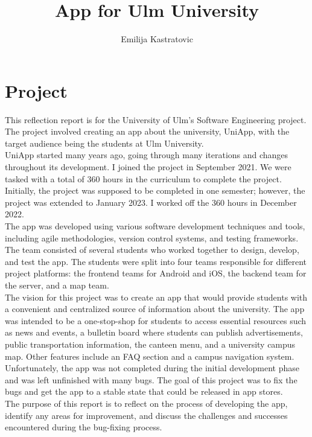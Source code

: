 \documentclass[sf-font,usefira,english]{uulm/sp/article}
\title{App for Ulm University}
\author{Emilija Kastratovic}
\begin{document}
\maketitle

\section{Project}

This reflection report is for the University of Ulm’s Software Engineering project.\\

The project involved creating an app about the university, UniApp, with the target audience being the students at Ulm University.\\

UniApp started many years ago, going through many iterations and changes throughout its development.
I joined the project in September 2021.
We were tasked with a total of 360 hours in the curriculum to complete the project.
Initially, the project was supposed to be completed in one semester; 
however, the project was extended to January 2023. I worked off the 360 hours in December 2022.\\

The app was developed using various software development techniques and tools, including agile methodologies, version control systems, and testing frameworks. 
The team consisted of several students who worked together to design, develop, and test the app. 
The students were split into four teams responsible for different project platforms: 
the frontend teams for Android and iOS, the backend team for the server, and a map team.\\

The vision for this project was to create an app that would provide students with a convenient and centralized source of information about the university. 
The app was intended to be a one-stop-shop for students to access essential resources such as news and events, a bulletin board where students can publish advertisements, public transportation information, the canteen menu, and a university campus map.
Other features include an FAQ section and a campus navigation system.\\

Unfortunately, the app was not completed during the initial development phase and was left unfinished with many bugs.
The goal of this project was to fix the bugs and get the app to a stable state that could be released in app stores.\\
The purpose of this report is to reflect on the process of developing the app, identify any areas for improvement, and discuss the challenges and successes encountered during the bug-fixing process.
\end{document}
